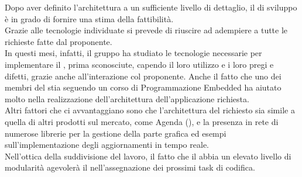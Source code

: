 Dopo aver definito l'architettura a un sufficiente livello di dettaglio, il  di sviluppo è in grado di fornire una stima della fattibilità.\\
Grazie alle tecnologie individuate si prevede di riuscire ad adempiere a tutte le richieste fatte dal proponente.\\
In questi mesi, infatti, il gruppo ha studiato le tecnologie necessarie per implementare il , prima sconosciute, capendo il loro utilizzo e i loro pregi e difetti, grazie anche all'interazione col proponente. Anche il fatto che uno dei membri del  stia seguendo un corso di Programmazione Embedded ha aiutato molto nella realizzazione dell'architettura dell'applicazione  richiesta. \\
Altri fattori che ci avvantaggiano sono che l'architettura del  richiesto sia simile a quella di altri prodotti sul mercato, come Agenda (), e la presenza in rete di numerose librerie per la gestione della parte grafica ed esempi sull'implementazione degli aggiornamenti in tempo reale.\\
Nell'ottica della suddivisione del lavoro, il fatto che il  abbia un elevato livello di modularità agevolerà il  nell'assegnazione dei prossimi task di codifica.\\
